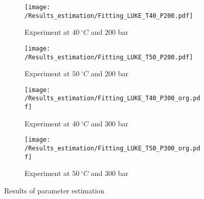 \documentclass[../Article_Model_Parameters.tex]{subfiles}
\begin{document}
	\begin{figure}[!h]
		\centering
		\begin{subfigure}[b]{\columnwidth}
			\centering
			\texttt{[image: /Results\_estimation/Fitting\_LUKE\_T40\_P200.pdf]}
			\caption{Experiment at $40~^\circ C$ and 200 bar}
		\end{subfigure}
		\begin{subfigure}[b]{\columnwidth}
			\centering
			\texttt{[image: /Results\_estimation/Fitting\_LUKE\_T50\_P200.pdf]}
			\caption{Experiment at $50~^\circ C$ and 200 bar}
		\end{subfigure}
		\hfill
		\begin{subfigure}[b]{\columnwidth}
			\centering
			\texttt{[image: /Results\_estimation/Fitting\_LUKE\_T40\_P300\_org.pdf]}
			\caption{Experiment at $40~^\circ C$ and 300 bar}
		\end{subfigure}
		\begin{subfigure}[b]{\columnwidth}
			\centering
			\texttt{[image: /Results\_estimation/Fitting\_LUKE\_T50\_P300\_org.pdf]}
			\caption{Experiment at $50~^\circ C$ and 300 bar}
		\end{subfigure}
		\caption{Results of parameter estimation}
		\label{fig: estimation_results}
	\end{figure}
	
\end{document}
